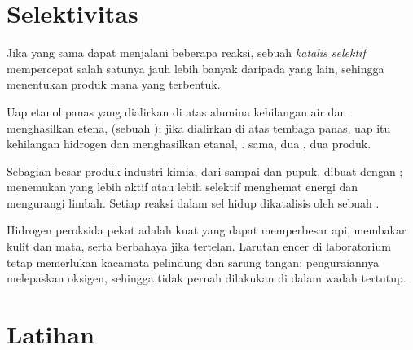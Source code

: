 \section{Selektivitas}

\begin{definition}\label{def:g12:catalysis:selective}
Jika  yang sama dapat menjalani beberapa reaksi, sebuah
\emph{katalis selektif} mempercepat salah
satunya jauh lebih banyak daripada yang lain, sehingga menentukan
produk mana yang terbentuk.
\end{definition}

\begin{example}\label{ex:g12:catalysis:ethanol}
Uap etanol panas yang dialirkan di atas alumina kehilangan air dan
menghasilkan etena,  (sebuah ); jika
dialirkan di atas tembaga panas, uap itu kehilangan hidrogen dan
menghasilkan etanal, .  sama, dua
, dua produk.
\end{example}

\begin{remark}\label{rem:g12:catalysis:everywhere}
Sebagian besar produk industri kimia, dari  sampai 
dan pupuk, dibuat dengan ; menemukan  yang lebih aktif
atau lebih selektif menghemat energi dan mengurangi limbah. Setiap
reaksi dalam sel hidup dikatalisis oleh sebuah .
\end{remark}

\begin{safety}{}
Hidrogen peroksida pekat adalah  kuat yang dapat memperbesar
api, membakar kulit dan mata, serta berbahaya jika tertelan. Larutan
encer di laboratorium tetap memerlukan kacamata pelindung dan sarung
tangan; penguraiannya melepaskan oksigen, sehingga tidak pernah
dilakukan di dalam wadah tertutup.
\end{safety}

\section{Latihan}


